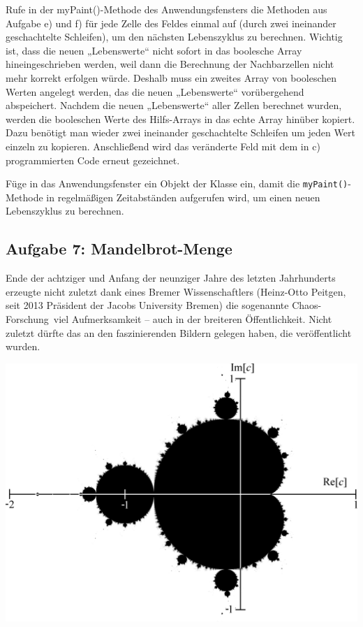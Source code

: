 \begin{compactenum}[a)]
\item Rufe in der myPaint()-Methode des Anwendungsfensters die Methoden aus
Aufgabe e) und f) für jede Zelle des Feldes einmal auf (durch zwei ineinander
geschachtelte Schleifen), um den nächsten Lebenszyklus zu berechnen. Wichtig
ist, dass die neuen „Lebenswerte“ nicht sofort in das boolesche Array
hineingeschrieben werden, weil dann die Berechnung der Nachbarzellen nicht mehr
korrekt erfolgen würde. Deshalb muss ein zweites Array von booleschen Werten
angelegt werden, das die neuen „Lebenswerte“ vorübergehend abspeichert. Nachdem
die neuen „Lebenswerte“ aller Zellen berechnet wurden, werden die booleschen
Werte des Hilfs-Arrays in das echte Array hinüber kopiert. Dazu benötigt man
wieder zwei ineinander geschachtelte Schleifen um jeden Wert einzeln zu
kopieren. Anschließend wird das veränderte Feld mit dem in c) programmierten
Code erneut gezeichnet.

\item Füge in das Anwendungsfenster ein Objekt der Klasse  ein,
damit die \lstinline|myPaint()|-Methode in regelmäßigen Zeitabständen aufgerufen
wird, um einen neuen Lebenszyklus zu berechnen.
\end{compactenum}


\subsection{Aufgabe 7: Mandelbrot-Menge}

Ende der achtziger und Anfang der neunziger Jahre des letzten Jahrhunderts
erzeugte nicht zuletzt dank eines Bremer Wissenschaftlers (Heinz-Otto Peitgen,
seit 2013 Präsident der Jacobs University Bremen) die sogenannte \glqq
Chaos-Forschung\grqq\ viel Aufmerksamkeit -- auch in der breiteren
Öffentlichkeit. Nicht zuletzt dürfte das an den faszinierenden Bildern gelegen
haben, die veröffentlicht wurden.

\begin{center}
\includegraphics[width=1.0\textwidth]{./inf/SEKII/18_Java_Arrays/Mandelset.png}
\end{center}

